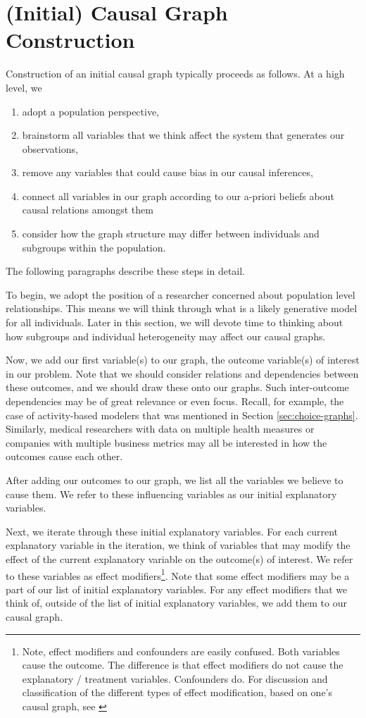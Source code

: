 \section{(Initial) Causal Graph Construction}
\label{sec:graph-construction}

Construction of an initial causal graph typically proceeds as follows.
At a high level, we
\begin{enumerate}
   \item adopt a population perspective,
   \item brainstorm all variables that we think affect the system that generates our observations,
   \item remove any variables that could cause bias in our causal inferences,
   \item connect all variables in our graph according to our a-priori beliefs about causal relations amongst them
   \item consider how the graph structure may differ between individuals and subgroups within the population.
\end{enumerate}
The following paragraphs describe these steps in detail.

To begin, we adopt the position of a researcher concerned about population level relationships.
This means we will think through what is a likely generative model for all individuals.
Later in this section, we will devote time to thinking about how subgroups and individual heterogeneity may affect our causal graphs.

Now, we add our first variable(s) to our graph, the outcome variable(s) of interest in our problem.
Note that we should consider relations and dependencies between these outcomes, and we should draw these onto our graphs.
Such inter-outcome dependencies may be of great relevance or even focus.
Recall, for example, the case of activity-based modelers that was mentioned in Section \ref{sec:choice-graphs}.
Similarly, medical researchers with data on multiple health measures or companies with multiple business metrics may all be interested in how the outcomes cause each other.

After adding our outcomes to our graph, we list all the variables we believe to cause them.
We refer to these influencing variables as our initial explanatory variables.

Next, we iterate through these initial explanatory variables.
For each current explanatory variable in the iteration, we think of variables that may modify the effect of the current explanatory variable on the outcome(s) of interest.
We refer to these variables as effect modifiers\footnote{Note, effect modifiers and confounders are easily confused. Both variables cause the outcome. The difference is that effect modifiers do not cause the explanatory / treatment variables. Confounders do. For discussion and classification of the different types of effect modification, based on one's causal graph, see \citet{vanderweele_2007_four}}.
Note that some effect modifiers may be a part of our list of initial explanatory variables.
For any effect modifiers that we think of, outside of the list of initial explanatory variables, we add them to our causal graph.

